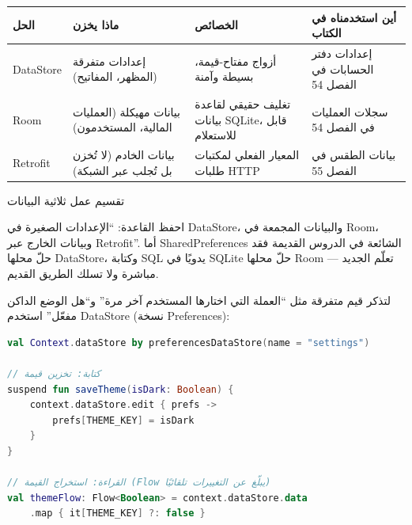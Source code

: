 


\begin{center}
\begin{tabularx}{\linewidth}{|X|X|X|X|}
\hline
\textbf{الحل} & \textbf{ماذا يخزن} & \textbf{الخصائص} & \textbf{أين استخدمناه في الكتاب} \tabularnewline
\hline
DataStore & إعدادات متفرقة (المظهر، المفاتيح) & أزواج مفتاح-قيمة، بسيطة وآمنة & إعدادات دفتر الحسابات في الفصل 54 \tabularnewline
Room & بيانات مهيكلة (العمليات المالية، المستخدمون) & تغليف حقيقي لقاعدة بيانات SQLite، قابل للاستعلام & سجلات العمليات في الفصل 54 \tabularnewline
Retrofit & بيانات الخادم (لا تُخزن بل تُجلب عبر الشبكة) & المعيار الفعلي لمكتبات طلبات HTTP & بيانات الطقس في الفصل 55 \tabularnewline
\hline
\end{tabularx}
\end{center}

\begin{center}\small\color{gray}تقسيم عمل ثلاثية البيانات\end{center}

احفظ القاعدة: “الإعدادات الصغيرة في DataStore، والبيانات المجمعة في Room، وبيانات الخارج عبر Retrofit”. أما SharedPreferences الشائعة في الدروس القديمة فقد حلّ محلها DataStore، وكتابة SQL يدويًا في SQLite حلّ محلها Room — تعلّم الجديد مباشرة ولا تسلك الطريق القديم.


لتذكر قيم متفرقة مثل “العملة التي اختارها المستخدم آخر مرة” و“هل الوضع الداكن مفعّل” استخدم DataStore (نسخة Preferences):

\begin{lstlisting}[language=Kotlin]
val Context.dataStore by preferencesDataStore(name = "settings")

// كتابة: تخزين قيمة
suspend fun saveTheme(isDark: Boolean) {
    context.dataStore.edit { prefs ->
        prefs[THEME_KEY] = isDark
    }
}

// القراءة: استخراج القيمة (Flow يبلّغ عن التغييرات تلقائيًا)
val themeFlow: Flow<Boolean> = context.dataStore.data
    .map { it[THEME_KEY] ?: false }
\end{lstlisting}

